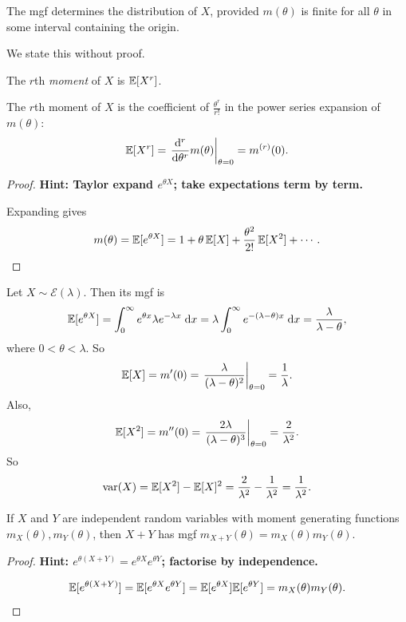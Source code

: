 \documentclass[a4paper]{article}
\begin{document}
\begin{thm}
  The mgf determines the distribution of $X$, provided $m(\theta)$ is finite for all $\theta$ in some interval containing the origin.
\end{thm}
We state this without proof.

\begin{defi}[Moment]
  The $r$th \emph{moment} of $X$ is $\mathbb{E}[X^r]$.
\end{defi}

\begin{thm}
  The $r$th moment of $X$ is the coefficient of $\frac{\theta^r}{r!}$ in the power series expansion of $m(\theta)$:
  \[
    \mathbb{E}[X^r] = \left.\frac{\mathrm{d}^r}{\mathrm{d}\theta^r} m(\theta)\right|_{\theta = 0} = m^{(r)}(0).
  \]
\end{thm}

\begin{proof}
  \textbf{Hint: Taylor expand $e^{\theta X}$; take expectations term by term.}

  Expanding gives
  \[
    m(\theta) = \mathbb{E}[e^{\theta X}] = 1 + \theta\,\mathbb{E}[X] + \frac{\theta^2}{2!}\,\mathbb{E}[X^2] + \dotsb\,.\qedhere
  \]
\end{proof}

\begin{eg}
  Let $X\sim \mathcal{E}(\lambda)$. Then its mgf is
  \[
    \mathbb{E}[e^{\theta X}] = \int_0^\infty e^{\theta x}\lambda e^{-\lambda x}\;\mathrm{d} x = \lambda\int_0^\infty e^{-(\lambda - \theta )x}\;\mathrm{d} x = \frac{\lambda}{\lambda - \theta},
  \]
  where $0 < \theta < \lambda$. So
  \[
    \mathbb{E}[X] = m'(0) = \left.\frac{\lambda}{(\lambda - \theta)^2}\right|_{\theta = 0} = \frac{1}{\lambda}.
  \]
  Also,
  \[
    \mathbb{E}[X^2] = m''(0) = \left.\frac{2\lambda}{(\lambda - \theta)^3}\right|_{\theta = 0} = \frac{2}{\lambda^2}.
  \]
  So
  \[
    \operatorname{var}(X) = \mathbb{E}[X^2] - \mathbb{E}[X]^2 = \frac{2}{\lambda^2} - \frac{1}{\lambda^2} = \frac{1}{\lambda^2}.
  \]
\end{eg}

\begin{thm}
  If $X$ and $Y$ are independent random variables with moment generating functions $m_X(\theta), m_Y(\theta)$, then $X + Y$ has mgf $m_{X + Y}(\theta) = m_X(\theta)m_Y(\theta)$.
\end{thm}

\begin{proof}
  \textbf{Hint: $e^{\theta(X+Y)} = e^{\theta X} e^{\theta Y}$; factorise by independence.}

  \[
    \mathbb{E}[e^{\theta(X + Y)}] = \mathbb{E}[e^{\theta X}e^{\theta Y}] = \mathbb{E}[e^{\theta X}]\mathbb{E}[e^{\theta Y}] = m_X(\theta)m_Y(\theta).\qedhere
  \]
\end{proof}
\end{document}
